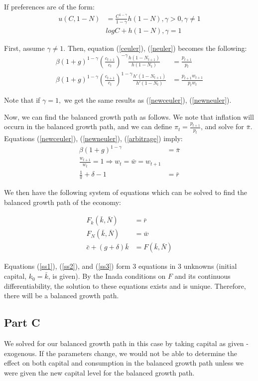 \documentclass[11pt]{article} %
\begin{document}
If preferences are of the form:
\begin{align*}
u(C,1-N) &= \frac{C^{1-\gamma}}{1-\gamma}h (1-N), \gamma >0, \gamma \neq 1\\
& logC + h(1-N), \gamma = 1
\end{align*}

First, assume $\gamma \neq 1.$ Then, equation (\ref{ceuler}), (\ref{neuler}) becomes the following:
\begin{align}
\beta (1+g)^{1-\gamma}\left( \frac{c_{t+1}}{c_t}\right)^{-\gamma} \frac{h(1-N_{t+1})}{h(1-N_t)} &= \frac{p_{t+1}}{p_t} \label{newceuler} \\
\beta (1+g)^{1-\gamma}\left( \frac{c_{t+1}}{c_t}\right)^{1-\gamma} \frac{h'(1-N_{t+1})}{h'(1-N_t)} &= \frac{p_{t+1}w_{t+1}}{p_tw_t} \label{newneuler}
\end{align}

Note that if $\gamma=1,$ we get the same results as (\ref{newceuler}), (\ref{newneuler}).

Now, we can find the balanced growth path as follows. We note that inflation will occurn in the balanced growth path, and we can define $\pi_t = \frac{p_{t+1}}{p_t}$, and solve for $\bar{\pi}$. Equations (\ref{newceuler}), (\ref{newneuler}), (\ref{arbitrage}) imply:
\begin{align*}
\beta(1+g)^{1-\gamma} &= \bar{\pi}\\
\frac{w_{t+1}}{w_t} = 1 \Rightarrow w_t = \bar{w} = w_{t+1} \\
\frac{1}{\bar{\pi}} + \delta - 1 &= \bar{r}
\end{align*}

We then have the following system of equations which can be solved to find the balanced growth path of the economy:

\begin{align}
F_k(\bar{k},\bar{N}) &= \bar{r} \label{ss1}\\
F_N(\bar{k},\bar{N}) &= \bar{w}\label{ss2} \\
\bar{c} + (g+\delta)\bar{k} &= F(\bar{k},\bar{N}) \label{ss3}
\end{align}

Equations (\ref{ss1}), (\ref{ss2}), and (\ref{ss3}) form 3 equations in 3 unknowns (initial capital, $k_0 = \bar{k}$, is given). By the Inada conditions on $F$ and its continuous differentiability, the solution to these equations exists and is unique. Therefore, there will be a balanced growth path.

\subsection{Part C}
We solved for our balanced growth path in this case by taking capital as given - exogenous. If the parameters change, we would not be able to determine the effect on both capital and consumption in the balanced growth path unless we were given the new capital level for the balanced growth path.
\end{document}
